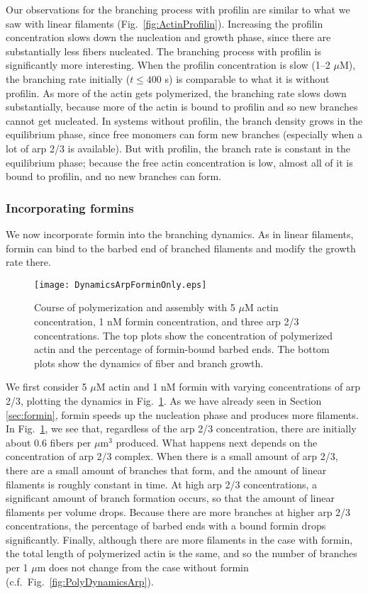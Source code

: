 \documentclass[11pt]{article}
\begin{document}
Our observations for the branching process with profilin are similar to what we saw with linear filaments (Fig.\ \ref{fig:ActinProfilin}). Increasing the profilin concentration slows down the nucleation and growth phase, since there are substantially less fibers nucleated. The branching process with profilin is significantly more interesting. When the profilin concentration is slow (1--2 $\mu$M), the branching rate initially ($t \leq 400$ s) is comparable to what it is without profilin. As more of the actin gets polymerized, the branching rate slows down substantially, because more of the actin is bound to profilin and so new branches cannot get nucleated. In systems without profilin, the branch density grows in the equilibrium phase, since free monomers can form new branches (especially when a lot of arp 2/3 is available). But with profilin, the branch rate is constant in the equilibrium phase; because the free actin concentration is low, almost all of it is bound to profilin, and no new branches can form. 

\subsubsection{Incorporating formins}
We now incorporate formin into the branching dynamics. As in linear filaments, formin can bind to the barbed end of branched filaments and modify the growth rate there. 

\begin{figure}
\centering
\texttt{[image: DynamicsArpForminOnly.eps]}
\caption{\label{fig:ArpFormin}Course of polymerization and assembly with 5 $\mu$M actin concentration, 1 nM formin concentration, and three arp 2/3 concentrations. The top plots show the concentration of polymerized actin and the percentage of formin-bound barbed ends. The bottom plots show the dynamics of fiber and branch growth. }
\end{figure}

We first consider 5 $\mu$M actin and 1 nM formin with varying concentrations of arp 2/3, plotting the dynamics in Fig.\ \ref{fig:ArpFormin}. As we have already seen in Section \ref{sec:formin}, formin speeds up the nucleation phase and produces more filaments. In Fig.\ \ref{fig:ArpFormin}, we see that, regardless of the arp 2/3 concentration, there are initially about 0.6 fibers per $\mu$m$^3$ produced. What happens next depends on the concentration of arp 2/3 complex. When there is a small amount of arp 2/3, there are a small amount of branches that form, and the amount of linear filaments is roughly constant in time. At high arp 2/3 concentrations, a significant amount of branch formation occurs, so that the amount of linear filaments per volume drops. Because there are more branches at higher arp 2/3 concentrations, the percentage of barbed ends with a bound formin drops significantly. Finally, although there are more filaments in the case with formin, the total length of polymerized actin is the same, and so the number of branches per 1 $\mu$m does not change from the case without formin (c.f.\ Fig.\ \ref{fig:PolyDynamicsArp}). 
\end{document}
